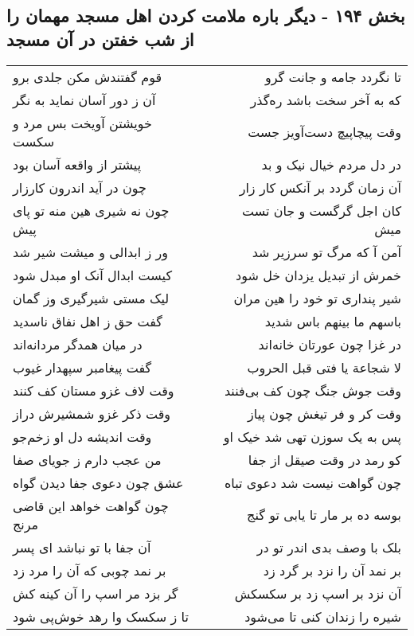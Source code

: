 \begin{center}
\section*{بخش ۱۹۴ - دیگر باره ملامت کردن اهل مسجد مهمان را از شب خفتن در آن مسجد}
\label{sec:sh194}
\begin{longtable}{l p{0.5cm} r}
قوم گفتندش مکن جلدی برو
&&
تا نگردد جامه و جانت گرو
\\
آن ز دور آسان نماید به نگر
&&
که به آخر سخت باشد ره‌گذر
\\
خویشتن آویخت بس مرد و سکست
&&
وقت پیچاپیچ دست‌آویز جست
\\
پیشتر از واقعه آسان بود
&&
در دل مردم خیال نیک و بد
\\
چون در آید اندرون کارزار
&&
آن زمان گردد بر آنکس کار زار
\\
چون نه شیری هین منه تو پای پیش
&&
کان اجل گرگست و جان تست میش
\\
ور ز ابدالی و میشت شیر شد
&&
آمن آ که مرگ تو سرزیر شد
\\
کیست ابدال آنک او مبدل شود
&&
خمرش از تبدیل یزدان خل شود
\\
لیک مستی شیرگیری وز گمان
&&
شیر پنداری تو خود را هین مران
\\
گفت حق ز اهل نفاق ناسدید
&&
باسهم ما بینهم باس شدید
\\
در میان همدگر مردانه‌اند
&&
در غزا چون عورتان خانه‌اند
\\
گفت پیغامبر سپهدار غیوب
&&
لا شجاعة یا فتی قبل الحروب
\\
وقت لاف غزو مستان کف کنند
&&
وقت جوش جنگ چون کف بی‌فنند
\\
وقت ذکر غزو شمشیرش دراز
&&
وقت کر و فر تیغش چون پیاز
\\
وقت اندیشه دل او زخم‌جو
&&
پس به یک سوزن تهی شد خیک او
\\
من عجب دارم ز جویای صفا
&&
کو رمد در وقت صیقل از جفا
\\
عشق چون دعوی جفا دیدن گواه
&&
چون گواهت نیست شد دعوی تباه
\\
چون گواهت خواهد این قاضی مرنج
&&
بوسه ده بر مار تا یابی تو گنج
\\
آن جفا با تو نباشد ای پسر
&&
بلک با وصف بدی اندر تو در
\\
بر نمد چوبی که آن را مرد زد
&&
بر نمد آن را نزد بر گرد زد
\\
گر بزد مر اسپ را آن کینه کش
&&
آن نزد بر اسپ زد بر سکسکش
\\
تا ز سکسک وا رهد خوش‌پی شود
&&
شیره را زندان کنی تا می‌شود
\\

\end{longtable}
\end{center}
